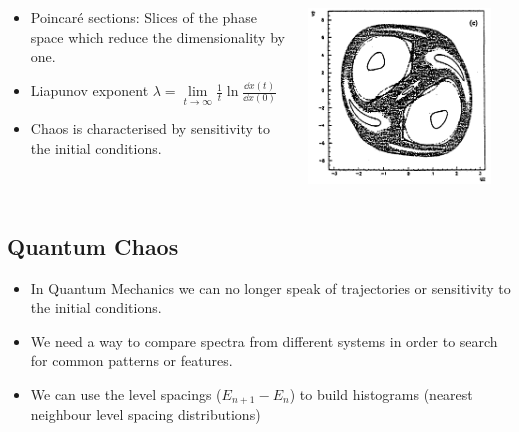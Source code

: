 \documentclass[a4,compress]{beamer}
\begin{document}
\begin{frame}
  \begin{columns}[c]
  \begin{column}{0.6\textwidth}
    \begin{itemize}
      \item Poincaré sections: Slices of the phase space which reduce the
      dimensionality by one.
      \item Liapunov exponent
      \(
        \lambda = \lim\limits_{t \to \infty} \frac{1}{t} \ln{\frac{\dd{x}(t)}{\dd{x}(0)}}
      \)
      \item Chaos is characterised by sensitivity to the initial conditions.
    \end{itemize}
  \end{column}
  \begin{column}{0.4\textwidth}
    \includegraphics[width=0.9\textwidth]{ponicare-sections-e_120}
  \end{column}
  \end{columns}

\end{frame}

\subsection{Quantum Chaos}


\begin{frame}
  \begin{itemize}
    \item In Quantum Mechanics we can no longer speak of trajectories
    or sensitivity to the initial conditions.
    \item We need a way to compare spectra from different systems
    in order to search for common patterns or features.
    \item We can use the level spacings (\(E_{n+1} - E_n\)) to build
    histograms (nearest neighbour level spacing distributions)
  \end{itemize}
\end{frame}
\end{document}
